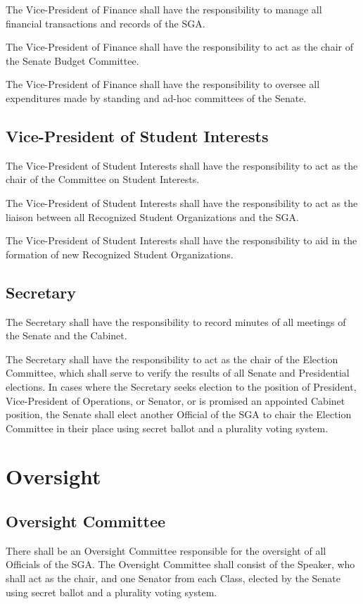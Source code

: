 \documentclass[12pt,oneside]{scrreprt}
\begin{document}
The Vice-President of Finance shall have the responsibility to manage all financial
transactions and records of the SGA.

The Vice-President of Finance shall have the responsibility to act as the chair of the
Senate Budget Committee.

The Vice-President of Finance shall have the responsibility to oversee all expenditures
made by standing and ad-hoc committees of the Senate.

\section{Vice-President of Student Interests}
The Vice-President of Student Interests shall have the responsibility to act as the chair of the Committee on Student Interests.

The Vice-President of Student Interests shall have the responsibility to act as the liaison between all Recognized Student Organizations and the SGA.

The Vice-President of Student Interests shall have the responsibility to aid in the
formation of new Recognized Student Organizations.

\section{Secretary}
The Secretary shall have the responsibility to record minutes of all meetings of the Senate and the Cabinet.

The Secretary shall have the responsibility to act as the chair of the Election Committee, which shall serve to verify the results of all Senate and Presidential elections. In cases where the Secretary seeks election to the position of President, Vice-President of Operations, or Senator, or is promised an appointed Cabinet position, the Senate shall elect another Official of the SGA to chair the Election Committee in their place using secret ballot and a plurality voting system.

\chapter{Oversight}

\section{Oversight Committee}
There shall be an Oversight Committee responsible for the oversight of all Officials of the SGA. The Oversight Committee shall consist of the Speaker, who shall act as the chair, and one Senator from each Class, elected by the Senate using secret ballot and a plurality voting system.
\end{document}
